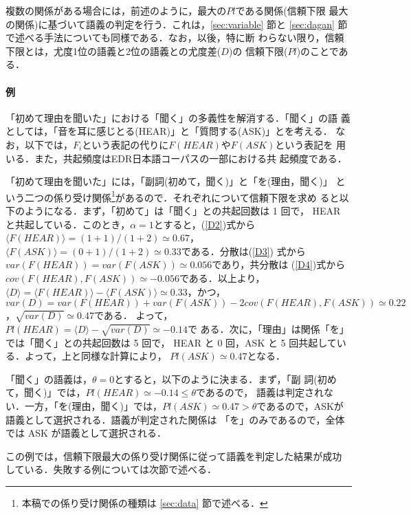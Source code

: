複数の関係がある場合には，前述のように，最大の$Pl$である関係(信頼下限
最大の関係)に基づいて語義の判定を行う．これは，\ref{sec:variable} 節と
\ref{sec:dagan} 節で述べる手法についても同様である．なお，以後，特に断
わらない限り，信頼下限とは，尤度1位の語義と2位の語義との尤度差($D$)の
信頼下限($Pl$)のことである．

\paragraph{例}

「初めて理由を聞いた」における「聞く」の多義性を解消する．「聞く」の語
義としては，「音を耳に感じとる(HEAR)」と「質問する(ASK)」とを考える．
なお，以下では，$F_i$という表記の代りに$F(HEAR)$や$F(ASK)$という表記を
用いる．また，共起頻度はEDR日本語コーパス\cite{EDR95}の一部における共
起頻度である．

「初めて理由を聞いた」には，「副詞(初めて，聞く)」と「を(理由，聞く)」
という二つの係り受け関係\footnote{本稿での係り受け関係の種類は
\ref{sec:data} 節で述べる．}があるので．それぞれについて信頼下限を求め
ると以下のようになる．まず，「初めて」は「聞く」との共起回数は 1 回で，
HEAR と共起している．このとき，$\alpha = 1$とすると，(\ref{D2})式から
$\langle F(HEAR) \rangle = (1 + 1)/(1 + 2) \simeq 0.67$，$\langle
F(ASK) \rangle = (0 + 1)/(1 + 2) \simeq 0.33$である．分散は(\ref{D3})
式から$var(F(HEAR)) = var(F(ASK)) \simeq 0.056 $であり，共分散は
(\ref{D4})式から$cov(F(HEAR),F(ASK)) \simeq - 0.056$である．以上より，
$\langle D \rangle = \langle F(HEAR) \rangle - \langle F(ASK) \rangle
\simeq 0.33$，かつ，$var(D) = var(F(HEAR)) + var(F(ASK)) - 2
cov(F(HEAR),F(ASK)) \simeq 0.22$，$\sqrt{var(D)} \simeq 0.47$である．
よって，$Pl(HEAR) = \langle D \rangle - \sqrt{var(D)} \simeq - 0.14$で
ある．次に，「理由」は関係「を」では「聞く」との共起回数は 5 回で，
HEAR と 0 回，ASK と 5 回共起している．よって，上と同様な計算により，
$Pl(ASK) \simeq 0.47$となる．

「聞く」の語義は，$\theta = 0$とすると，以下のように決まる．まず，「副
詞(初めて，聞く)」では，$Pl(HEAR) \simeq - 0.14 \le \theta$であるので，
語義は判定されない．一方，「を(理由，聞く)」では，$Pl(ASK) \simeq 0.47
> \theta$であるので，ASKが語義として選択される．語義が判定された関係は
「を」のみであるので，全体では ASK が語義として選択される．

この例では，信頼下限最大の係り受け関係に従って語義を判定した結果が成功
している．失敗する例については次節で述べる．

\vspace{\baselineskip}

